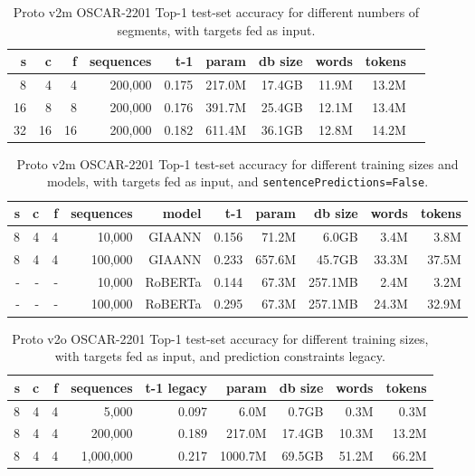 \begin{table}[H]
\centering
\caption{Proto v2m OSCAR-2201 Top-1 test-set accuracy for different numbers of segments, with targets fed as input.}
\label{tab:protov2m-oscar-test-top1-accuracy-segmentSizes-inferenceLeakyIntegrateAndFire}
\begin{tabular}{rrrrrrrrrr}
\toprule
\textbf{s} & \textbf{c} & \textbf{f} & \textbf{sequences} & \textbf{t-1} & \textbf{param} & \textbf{db size} & \textbf{words} & \textbf{tokens} \\
\midrule
8  & 4  & 4  & 200,000 & 0.175 & 217.0M & 17.4GB & 11.9M & 13.2M \\
16 & 8  & 8  & 200,000 & 0.176 & 391.7M & 25.4GB & 12.1M & 13.4M \\
32 & 16 & 16 & 200,000 & 0.182 & 611.4M & 36.1GB & 12.8M & 14.2M \\
\bottomrule
\end{tabular}
\end{table}

\begin{table}[H]
\centering
\caption{Proto v2m OSCAR-2201 Top-1 test-set accuracy for different training sizes and models, with targets fed as input, and \texttt{sentencePredictions=False}.}
\label{tab:protov2m-oscar-test-top1-accuracy-models-inferenceLeakyIntegrateAndFire}
\begin{tabular}{rrrrrrrrrr}
\toprule
\textbf{s} & \textbf{c} & \textbf{f} & \textbf{sequences} & \textbf{model} & \textbf{t-1} & \textbf{param} & \textbf{db size} & \textbf{words} & \textbf{tokens} \\
\midrule
8 & 4 & 4 & 10,000  & GIAANN & 0.156 & 71.2M & 6.0GB & 3.4M & 3.8M \\
8 & 4 & 4 & 100,000 & GIAANN & 0.233 & 657.6M & 45.7GB & 33.3M & 37.5M \\
- & - & - & 10,000  & RoBERTa & 0.144 & 67.3M & 257.1MB & 2.4M & 3.2M \\
- & - & - & 100,000 & RoBERTa & 0.295 & 67.3M & 257.1MB & 24.3M & 32.9M \\
\bottomrule
\end{tabular}
\end{table}

\begin{table}[H]
\centering
\caption{Proto v2o OSCAR-2201 Top-1 test-set accuracy for different training sizes, with targets fed as input, and prediction constraints legacy.}
\label{tab:protov2o-oscar-test-top1-accuracy-inferenceLeakyIntegrateAndFire}
\begin{tabular}{rrrrrrrrr}
\toprule
\textbf{s} & \textbf{c} & \textbf{f} & \textbf{sequences} & \textbf{t-1 legacy} & \textbf{param} & \textbf{db size} & \textbf{words} & \textbf{tokens} \\
\midrule
8 & 4 & 4 & 5,000     & 0.097 & 6.0M & 0.7GB & 0.3M & 0.3M  \\
8 & 4 & 4 & 200,000   & 0.189 & 217.0M  & 17.4GB & 10.3M & 13.2M \\
8 & 4 & 4 & 1,000,000 & 0.217 & 1000.7M & 69.5GB & 51.2M & 66.2M \\
\bottomrule
\end{tabular}
\end{table}


